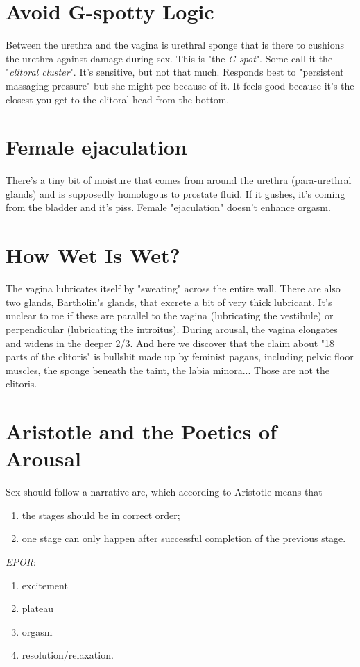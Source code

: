 \section{Avoid G-spotty Logic}
\begin{outline}
\1 Between the urethra and the vagina is urethral sponge that is there to cushions the urethra against damage during sex.
\1 This is "the \emph{G-spot}". Some call it the "\emph{clitoral cluster}".
\1 It's sensitive, but not that much. Responds best to "persistent massaging pressure" but she might pee because of it. It feels good because it's the closest you get to the clitoral head from the bottom.
\end{outline}

\section{Female ejaculation}
\begin{outline}
\1 There's a tiny bit of moisture that comes from around the urethra (para-urethral glands) and is supposedly homologous to prostate fluid. If it gushes, it's coming from the bladder and it's piss.
\1 Female "ejaculation" doesn't enhance orgasm.
\end{outline}

\section{How Wet Is Wet?}
\begin{outline}
\1 The vagina lubricates itself by "sweating" across the entire wall.
\1 There are also two glands, Bartholin's glands, that excrete a bit of very thick lubricant. It's unclear to me if these are parallel to the vagina (lubricating the vestibule) or perpendicular (lubricating the introitus).
\1 During arousal, the vagina elongates and widens in the deeper 2/3.
\1 And here we discover that the claim about "18 parts of the clitoris" is bullshit made up by feminist pagans, including pelvic floor muscles, the sponge beneath the taint, the labia minora... Those are not the clitoris.
\end{outline}

\section{Aristotle and the Poetics of Arousal}
\begin{outline}
\1 Sex should follow a narrative arc, which according to Aristotle means that 
\begin{enumerate}
	\item the stages should be in correct order;
	\item one stage can only happen after successful completion of the previous stage.
\end{enumerate}
\1 \emph{EPOR}: 
\begin{enumerate}
	\item excitement
	\item plateau
	\item orgasm
	\item resolution/relaxation.
\end{enumerate}
\end{outline}

